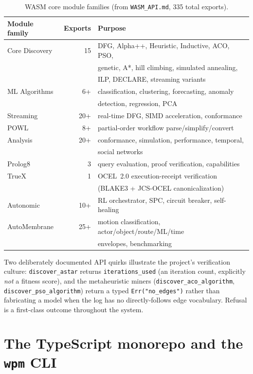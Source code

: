 \documentclass[11pt,oneside]{report}
\newcommand{\wpm}{\texttt{wpm}}
\begin{document}
\begin{table}[ht]
\centering
\caption{WASM core module families (from \texttt{WASM\_API.md}, 335 total
exports).}
\label{tab:wasmmodules}
\begin{tabular}{lrl}
\toprule
Module family & Exports & Purpose \\
\midrule
Core Discovery & 15 & DFG, Alpha++, Heuristic, Inductive, ACO, PSO, \\
 & & genetic, A*, hill climbing, simulated annealing, \\
 & & ILP, DECLARE, streaming variants \\
ML Algorithms & 6+ & classification, clustering, forecasting, anomaly \\
 & & detection, regression, PCA \\
Streaming & 20+ & real-time DFG, SIMD acceleration, conformance \\
POWL & 8+ & partial-order workflow parse/simplify/convert \\
Analysis & 20+ & conformance, simulation, performance, temporal, \\
 & & social networks \\
Prolog8 & 3 & query evaluation, proof verification, capabilities \\
TrueX & 1 & OCEL~2.0 execution-receipt verification \\
 & & (BLAKE3 + JCS-OCEL canonicalization) \\
Autonomic & 10+ & RL orchestrator, SPC, circuit breaker, self-healing \\
AutoMembrane & 25+ & motion classification, actor/object/route/ML/time \\
 & & envelopes, benchmarking \\
\bottomrule
\end{tabular}
\end{table}

Two deliberately documented API quirks illustrate the project's
verification culture: \texttt{discover\_astar} returns
\texttt{iterations\_used} (an iteration count, explicitly \emph{not} a
fitness score), and the metaheuristic miners (\texttt{discover\_aco\_algorithm},
\texttt{discover\_pso\_algorithm}) return a typed \texttt{Err("no\_edges")}
rather than fabricating a model when the log has no directly-follows edge
vocabulary. Refusal is a first-class outcome throughout the system.

\section{The TypeScript monorepo and the \wpm{} CLI}
\end{document}
